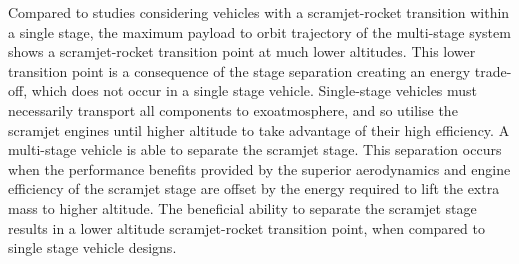 Compared to studies considering vehicles with a scramjet-rocket transition within a single stage\cite{Lu1993}\cite{Trefny1999}, the maximum payload to orbit trajectory of the multi-stage system shows a scramjet-rocket transition point at much lower altitudes.
This lower transition point is a consequence of the stage separation creating an energy trade-off, which does not occur in a single stage vehicle. Single-stage vehicles must necessarily transport all components to exoatmosphere, and so utilise the scramjet engines until higher altitude to take advantage of their high efficiency. A multi-stage vehicle is able to separate the scramjet stage. 
This separation occurs when the performance benefits provided by the superior aerodynamics and engine efficiency of the scramjet stage are offset by the energy required to lift the extra mass to higher altitude. The beneficial ability
to separate the scramjet stage results in a lower altitude scramjet-rocket transition point, when compared to single
stage vehicle designs.

